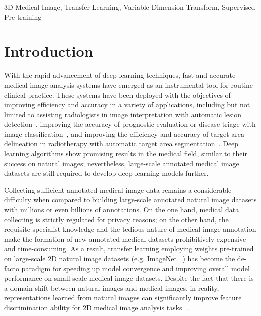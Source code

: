 \documentclass[journal,twoside,web]{ieeecolor}
\begin{document}
\begin{IEEEkeywords}
3D Medical Image, Transfer Learning, Variable Dimension Transform, Supervised Pre-training
\end{IEEEkeywords}





\section{Introduction}
\label{sec1}

With the rapid advancement of deep learning techniques, fast and accurate medical image analysis systems have emerged as an instrumental tool for routine clinical practice. These systems have been deployed with the objectives of improving efficiency and accuracy in a variety of applications, including but not limited to assisting radiologists in image interpretation with automatic lesion detection~\cite{liu2020cross,ren2016faster}, improving the accuracy of prognostic evaluation or disease triage with image classification~\cite{peng2019prognostic,wu2020covid,he2016deep}, and improving the efficiency and accuracy of target area delineation in radiotherapy with automatic target area segmentation~\cite{kamnitsas2017efficient,falk2019u}. Deep learning algorithms show promising results in the medical field, similar to their success on natural images; nevertheless, large-scale annotated medical image datasets are still required to develop deep learning models further.

Collecting sufficient annotated medical image data remains a considerable difficulty when compared to building large-scale annotated natural image datasets with millions or even billions of annotations.  On the one hand, medical data collecting is strictly regulated for privacy reasons; on the other hand, the requisite specialist knowledge and the tedious nature of medical image annotation make the formation of new annotated medical datasets prohibitively expensive and time-consuming. As a result, transfer learning employing weights pre-trained on large-scale 2D natural image datasets (e.g. ImageNet ~\cite{ILSVRC15}) has become the de-facto paradigm for speeding up model convergence and improving overall model performance on small-scale medical image datasets. Despite the fact that there is a domain shift between natural images and medical images, in reality, representations learned from natural images can significantly improve feature discrimination ability for 2D medical image analysis tasks ~\cite{gulshan2016development,lakhani2017deep}. 
\end{document}
